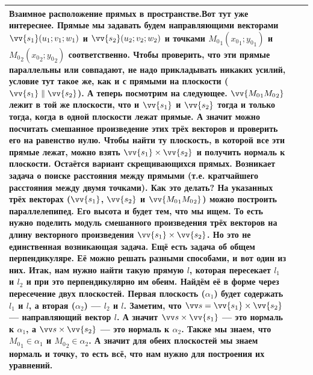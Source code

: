 \documentclass{article}
\let\vec\vv
\begin{document}
\begin{itemize}
\begin{Comment}
\begin{tabular}{|m{}|m{}|m{}|}
                Взаимное расположение прямых в пространстве.\newline Вот тут уже интереснее. Прямые мы задавать будем направляющими векторами $\vec{s_1}(u_1;v_1;w_1)$ и $\vec{s_2}(u_2;v_2;w_2)$ и точками ${M_0}_1({x_0}_1;{y_0}_1)$ и ${M_0}_2({x_0}_2;{y_0}_2)$ соответственно. Чтобы проверить, что эти прямые параллельны или совпадают, не надо прикладывать никаких усилий, условие тут такое же, как и с прямыми на плоскости ($\vec{s_1}\parallel\vec{s_2}$). А теперь посмотрим на следующее. $\vec{{M_0}_1{M_0}_2}$ лежит в той же плоскости, что и $\vec{s_1}$ и $\vec{s_2}$ тогда и только тогда, когда в одной плоскости лежат прямые. А значит можно посчитать смешанное произведение этих трёх векторов и проверить его на равенство нулю. Чтобы найти ту плоскость, в которой все эти прямые лежат, можно взять $\vec{s_1}\times\vec{s_2}$ и получить нормаль к плоскости.\newline
                Остаётся вариант скрещивающихся прямых. Возникает задача о поиске расстояния между прямыми (т.е. кратчайшего расстояния между двумя точками). Как это делать? На указанных трёх векторах ($\vec{s_1}$, $\vec{s_2}$ и $\vec{{M_0}_1{M_0}_2}$) можно построить параллелепипед. Его высота и будет тем, что мы ищем. То есть нужно поделить модуль смешанного произведения трёх векторов на длину векторного произведения $\vec{s_1}\times\vec{s_2}$. Но это не единственная возникающая задача. Ещё есть задача об общем перпендикуляре. Её можно решать разными способами, и вот один из них. Итак, нам нужно найти такую прямую $l$, которая пересекает $l_1$ и $l_2$ и при это перпендикулярно им обеим. Найдём её в форме через пересечение двух плоскостей. Первая плоскость ($\alpha_1$) будет содержать $l_1$ и $l$, а вторая ($\alpha_2$) --- $l_2$ и $l$. Заметим, что $\vec s=\vec{s_1}\times\vec{s_2}$ --- направляющий вектор $l$. А значит $\vec s\times\vec{s_1}$ --- это нормаль к $\alpha_1$, а $\vec s\times\vec{s_2}$ --- это нормаль к $\alpha_2$. Также мы знаем, что ${M_0}_1\in\alpha_1$ и ${M_0}_2\in\alpha_2$. А значит для обеих плоскостей мы знаем нормаль и точку, то есть всё, что нам нужно для построения их уравнений.\\
                \hline

\end{tabular}
\end{Comment}
\end{itemize}
\end{document}
